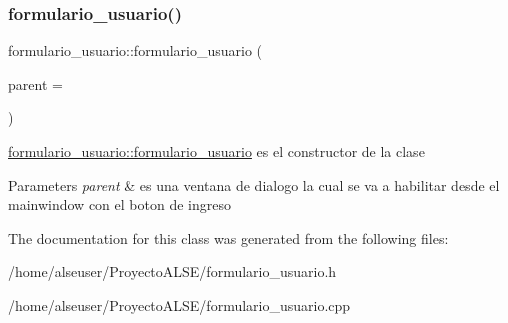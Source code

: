 \subsubsection{\texorpdfstring{formulario\+\_\+usuario()}{formulario\_usuario()}}
{\footnotesize\ttfamily formulario\+\_\+usuario\+::formulario\+\_\+usuario (\begin{DoxyParamCaption}\item[{Q\+Widget $\ast$}]{parent = {} }\end{DoxyParamCaption})\hspace{0.3cm}{\ttfamily [explicit]}}



\hyperlink{classformulario__usuario_a85cf7bd7b98128c1690d7825b0d6493d}{formulario\+\_\+usuario\+::formulario\+\_\+usuario} es el constructor de la clase 


\begin{DoxyParams}{Parameters}
{\em parent} & es una ventana de dialogo la cual se va a habilitar desde el mainwindow con el boton de ingreso \\
\hline
\end{DoxyParams}


The documentation for this class was generated from the following files\+:\begin{DoxyCompactItemize}
\item 
/home/alseuser/\+Proyecto\+A\+L\+S\+E/formulario\+\_\+usuario.\+h\item 
/home/alseuser/\+Proyecto\+A\+L\+S\+E/formulario\+\_\+usuario.\+cpp\end{DoxyCompactItemize}
